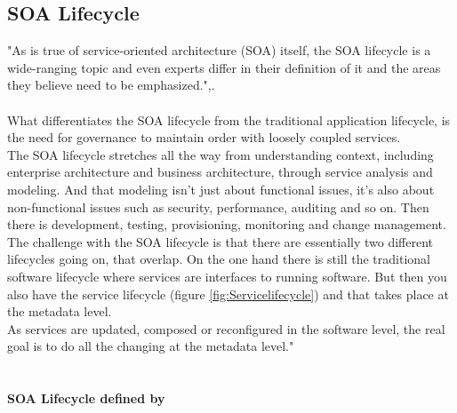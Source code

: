\documentclass[12pt]{article}
\begin{document}
\subsection{SOA Lifecycle}
"As is true of service-oriented architecture (SOA) itself, the SOA lifecycle is a wide-ranging topic and even experts differ in their definition of it and the areas they believe need to be emphasized.",\cite{soalycman}.\\\\
What differentiates the SOA lifecycle from the traditional application lifecycle, is the need for governance to maintain order with loosely coupled services.\cite{soalycman}
\\
The SOA lifecycle stretches all the way from understanding context, including enterprise architecture and business architecture, through service analysis and modeling. And that modeling isn't just about functional issues, it's also about non-functional issues such as security, performance, auditing and so on. Then there is development, testing, provisioning, monitoring and change management. \cite{soalycman}\\
The challenge with the SOA lifecycle is that there are essentially two different lifecycles going on, that overlap. On the one hand there is still the traditional software lifecycle where services are interfaces to running software. But then you also have the service lifecycle (figure \ref{fig:Servicelifecycle}) and that takes place at the metadata level.\\
As services are updated, composed or reconfigured in the software level, the real goal is to do all the changing at the metadata level."\cite{soalycman}\\
\\
\\
\textbf{SOA Lifecycle defined by \cite{soalycman}}
\end{document}
